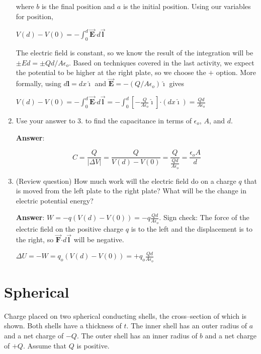 \documentclass{article}
\newcommand{\ds}[0]{\displaystyle}
\newcommand{\ihat}[0]{\hat{\boldsymbol{\imath}}}
\newcommand{\bfvec}[1]{\vec{\mathbf{#1}}}
\newcommand{\bfcdot}[0]{\boldsymbol{\cdot}}
\begin{document}
\begin{enumerate}
        where $b$ is the final position and $a$ is the initial position. Using our variables for position,

        $\ds V(d)-V(0) = -\int_0^d\bfvec{E}\bfcdot d\bfvec{l}$

        The electric field is constant, so we know the result of the integration will be $\pm Ed=\pm Qd/A\epsilon_o$. Based on techniques covered in the last activity, we expect the potential to be higher at the right plate, so we choose the $+$ option. More formally, using $d\mathbf{l}=dx\ihat$  and $\bfvec{E}=-({Q}/{A\epsilon_o})\ihat$ gives

        $\ds V(d)-V(0) = -\int_0^d\bfvec{E}\bfcdot d\bfvec{l}=-\int_0^d\left[-\frac{Q}{A\epsilon_o}\ihat\right]\bfcdot (dx\ihat)=\frac{Qd}{A\epsilon_o}$
        \else
        \vskip 36pt
        \fi

  \item Use your answer to 3. to find the capacitance in terms of $\epsilon_o$, $A$, and $d$.

        \ifsolutions
        {\bf Answer}:

        $$C = \frac{Q}{|\Delta V|} = \frac{Q}{V(d)-V(0)} = \frac{Q}{\frac{Qd}{A\epsilon_o}}=\frac{\epsilon_oA}{d}$$
        \else
        \vskip 36pt
        \fi

  \item (Review question) How much work will the electric field do on a charge $q$ that is moved from the left plate to the right plate? What will be the change in electric potential energy?

        \ifsolutions
        {\bf Answer}: $\ds W=-q(V(d)-V(0))=-q\frac{Qd}{A\epsilon_o}$. Sign check: The force of the electric field on the positive charge $q$ is to the left and the displacement is to the right, so $\bfvec{F}\bfcdot d\bfvec{l}$ will be negative.

        $\ds\Delta U=-W=q_o(V(d)-V(0))=+q_o\frac{Qd}{A\epsilon_o}$
        \else
        \vskip 36pt
        \fi

\end{enumerate}

\section{Spherical}

Charge placed on two spherical conducting shells, the cross--section of which is shown. Both shells have a thickness of $t$. The inner shell has an outer radius of $a$ and a net charge of $-Q$. The outer shell has an inner radius of $b$ and a net charge of $+Q$. Assume that $Q$ is positive.
\end{document}
